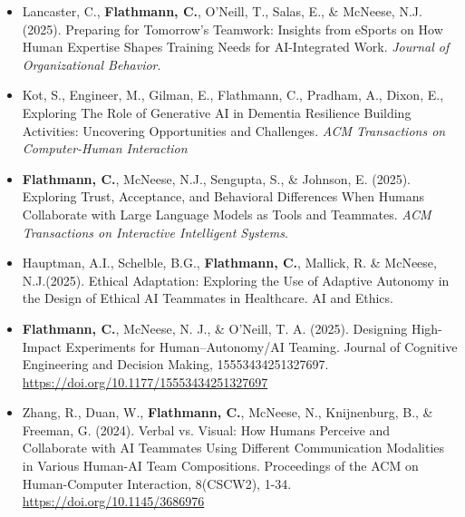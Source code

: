 \bigskip 
\begin{itemize}[align=left, labelwidth=3em,]
\setlength\itemsep{1em}





\item[JA.29] Lancaster, C., \textbf{Flathmann, C.}, O'Neill, T., Salas, E., \& McNeese, N.J. (2025). Preparing for Tomorrow’s Teamwork: Insights from eSports on How Human Expertise Shapes Training Needs for AI-Integrated Work. \textit{Journal of Organizational Behavior}. \\

\item[JA.28] Kot, S., Engineer, M., Gilman, E., Flathmann, C., Pradham, A., Dixon, E., Exploring The Role of Generative AI in Dementia Resilience Building Activities: Uncovering Opportunities and Challenges. \textit{ACM Transactions on Computer-Human Interaction} \\




\item[JA.27] \textbf{Flathmann, C.}, McNeese, N.J., Sengupta, S., \& Johnson, E. (2025). Exploring Trust, Acceptance, and Behavioral Differences When Humans Collaborate with Large Language Models as Tools and Teammates. \textit{ACM Transactions on Interactive Intelligent Systems}. \\

\item[JA.26] Hauptman, A.I., Schelble, B.G., \textbf{Flathmann, C.}, Mallick, R. \& McNeese, N.J.(2025). Ethical Adaptation: Exploring the Use of Adaptive Autonomy in the Design of Ethical AI Teammates in Healthcare. AI and Ethics. \\

\item[JA.25] \textbf{Flathmann, C.}, McNeese, N. J., \& O’Neill, T. A. (2025). Designing High-Impact Experiments for Human–Autonomy/AI Teaming. Journal of Cognitive Engineering and Decision Making, 15553434251327697. \url{https://doi.org/10.1177/15553434251327697}

\item[JA.24] Zhang, R., Duan, W., \textbf{Flathmann, C.}, McNeese, N., Knijnenburg, B., \& Freeman, G. (2024). Verbal vs. Visual: How Humans Perceive and Collaborate with AI Teammates Using Different Communication Modalities in Various Human-AI Team Compositions. Proceedings of the ACM on Human-Computer Interaction, 8(CSCW2), 1-34. \url{https://doi.org/10.1145/3686976}


\end{itemize}
